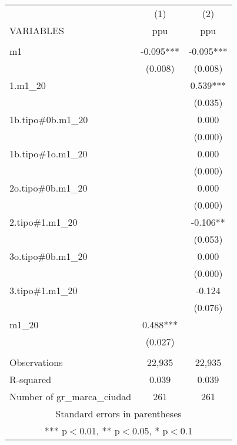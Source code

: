 \begin{tabular}{lcc} \hline
 & (1) & (2) \\
VARIABLES & ppu & ppu \\ \hline
 &  &  \\
m1 & -0.095*** & -0.095*** \\
 & (0.008) & (0.008) \\
1.m1\_20 &  & 0.539*** \\
 &  & (0.035) \\
1b.tipo\#0b.m1\_20 &  & 0.000 \\
 &  & (0.000) \\
1b.tipo\#1o.m1\_20 &  & 0.000 \\
 &  & (0.000) \\
2o.tipo\#0b.m1\_20 &  & 0.000 \\
 &  & (0.000) \\
2.tipo\#1.m1\_20 &  & -0.106** \\
 &  & (0.053) \\
3o.tipo\#0b.m1\_20 &  & 0.000 \\
 &  & (0.000) \\
3.tipo\#1.m1\_20 &  & -0.124 \\
 &  & (0.076) \\
m1\_20 & 0.488*** &  \\
 & (0.027) &  \\
 &  &  \\
Observations & 22,935 & 22,935 \\
R-squared & 0.039 & 0.039 \\
 Number of gr\_marca\_ciudad & 261 & 261 \\ \hline
\multicolumn{3}{c}{ Standard errors in parentheses} \\
\multicolumn{3}{c}{ *** p$<$0.01, ** p$<$0.05, * p$<$0.1} \\
\end{tabular}
